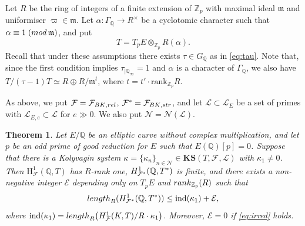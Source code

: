 \documentclass[10pt,reqno]{amsart}
\numberwithin{equation}{section}
\theoremstyle{plain}
\newtheorem{thm}{Theorem}[subsection] %
\theoremstyle{definition}
\newtheorem{rmk}[thm]{Remark}
\theoremstyle{definition}
\theoremstyle{plain}
\theoremstyle{plain}
\theoremstyle{plain}
\theoremstyle{plain}
\theoremstyle{plain}
\theoremstyle{plain}
\DeclareMathOperator{\ord}{ord}
\newcommand{\ind}{\operatorname{ind}}
\newcommand{\Z}{\mathbb{Z}}
\newcommand{\Q}{\mathbb{Q}}
\newcommand{\CE}{\mathcal{E}}
\DeclareMathOperator{\loc}{loc}
\newcommand{\Fcal}{\mathcal{F}}
\newcommand{\cL}{\mathcal{L}}
\newcommand{\cN}{\mathcal{N}}
\newcommand{\rank}{\mathrm{rank}}
\newcommand{\fm}{\mathfrak{m}}
\newcommand{\rH}{\mathrm{H}}
\begin{document}
Let $R$ be the ring of integers of a finite extension of $\Z_p$ with maximal ideal $\fm$ and uniformiser $\varpi\in\fm$. Let $\alpha: \Gamma_{\Q}\to R^{\times}$ be a cyclotomic character such that $\alpha\equiv 1\;({\rm mod}\,\fm)$, and put 
\[
T=T_pE\otimes_{\Z_p} R(\alpha).
\]
Recall that under these assumptions there exists $\tau\in G_\Q$ as in \eqref{eq:tau}.
Note that, since the first condition implies $\tau_{|\Q_\infty}=1$ and $\alpha$ is a character of $\Gamma_\Q$, we also have $T/(\tau -1)T\simeq R\oplus R/\fm^{t}$, where $t=t'\cdot\rank_{\Z_p}R$.

As above, we put $\Fcal=\Fcal_{\rm{BK},\rm rel}$, $\Fcal^*=\Fcal_{\rm{BK},\rm str}$, and let $\mathcal{L}\subset\mathcal{L}_E$ be a set of primes with $\mathcal{L}_{E,e}\subset\mathcal{L}$ for $e\gg 0$. We also put $\cN=\cN(\cL)$.

\begin{thm}\label{thm:boundcycleis}
Let $E/\Q$ be an elliptic curve without complex multiplication, and let $p$ be an odd prime of good reduction for $E$ such that 
$E(\Q)[p] = 0$.
Suppose that there is a Kolyvagin system $\kappa=\{\kappa_{n}\}_{n\in\cN}\in\mathbf{KS}(T,\Fcal,\cL)$ with $\kappa_{1}\neq 0$. Then $\rH^1_{\Fcal}(\Q,T)$ has $R$-rank one, ${\rm H}^1_{\Fcal^*}(\Q,T^*)$ is finite, and there exists a non-negative integer $\CE$ depending only on $T_pE$ and ${\rm rank}_{\Z_p}(R)$ such that 
\[
{\rm length}_{R}({\rm H}^1_{\Fcal^*}(\Q,T^*))\leq\ind(\kappa_1)+\CE,
\]
where $\ind(\kappa_1)={\rm length}_{R}\bigl({\rm H}^1_{\Fcal}(K,T)/R\cdot\kappa_{1}\bigr)$. Moreover, $\CE=0$ if \eqref{eq:irred} holds.
\end{thm}


\end{document}
